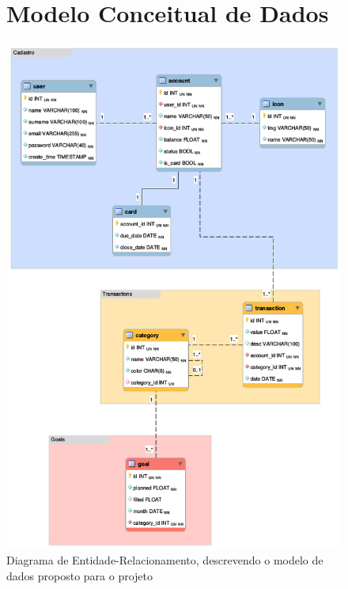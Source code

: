\documentclass[a4paper]{abnt}
\begin{document}
\begin{figure}
	\section{Modelo Conceitual de Dados}
	\label{sec:mod_dados}
	\centering
	\includegraphics[scale=0.55]{diagramas/er.png}
	\caption{Diagrama de Entidade-Relacionamento, descrevendo o modelo de dados proposto para o projeto}

	
\end{figure}

\printbibliography
\end{document}
